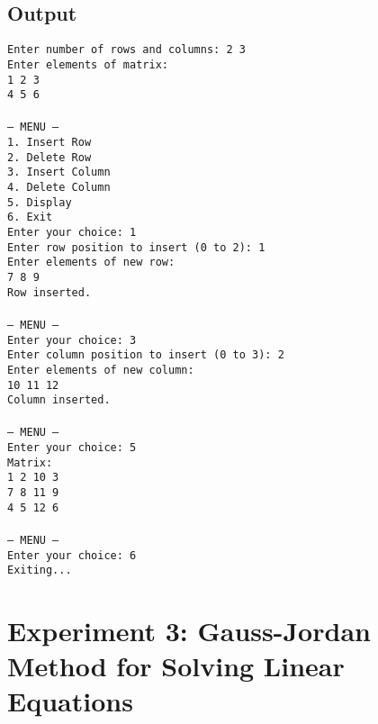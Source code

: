 \documentclass[12pt,a4paper]{article}
\begin{document}
\subsection*{Output}
\begin{tcolorbox}[terminalstyle, title=Sample Output]
\texttt{Enter number of rows and columns: 2 3 \\
Enter elements of matrix: \\
1 2 3 \\
4 5 6 \\
\\
--- MENU --- \\
1. Insert Row\\2. Delete Row\\3. Insert Column\\4. Delete Column\\5. Display\\6. Exit \\
Enter your choice: 1\\
Enter row position to insert (0 to 2): 1 \\
Enter elements of new row: \\
7 8 9\\
Row inserted. \\
\\
--- MENU --- \\
Enter your choice: 3 \\
Enter column position to insert (0 to 3): 2 \\
Enter elements of new column: \\
10 11 12\\
Column inserted. \\
\\
--- MENU --- \\
Enter your choice: 5 \\
Matrix: \\
1	2	10	3 \\
7	8	11	9 \\
4	5	12	6 \\
\\
--- MENU --- \\
Enter your choice: 6 \\
Exiting...}
\end{tcolorbox}

\newpage
\section*{Experiment 3: Gauss-Jordan Method for Solving Linear Equations}
\end{document}
